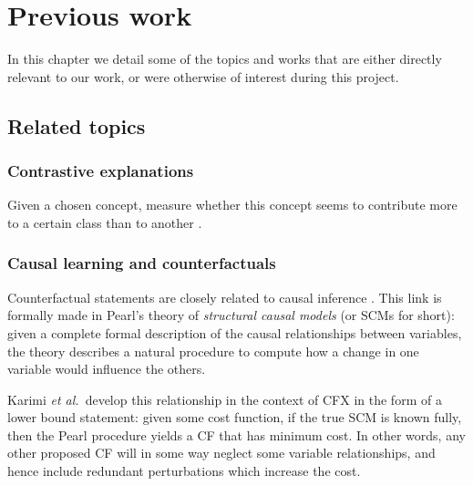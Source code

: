 \documentclass[../main.tex]{subfiles}
\begin{document}
\chapter{Previous work}
\label{ch:previous_work}

In this chapter we detail some of the topics and works that are either directly relevant to our work, or were otherwise of interest during this project.

\section{Related topics}

\subsection{Contrastive explanations}

Given a chosen concept, measure whether this concept seems to contribute more to a certain class than to another \cite{jacoviContrastive2021}.

\subsection{Causal learning and counterfactuals}

\cite{vowelsYa2023}

Counterfactual statements are closely related to causal inference \citenote.
This link is formally made in Pearl's theory of \emph{structural causal models} (or SCMs for short): given a complete formal description of the causal relationships between variables, the theory describes a natural procedure to compute how a change in one variable would influence the others. 

Karimi \textsl{et al.}~develop this relationship in the context of CFX in the form of a lower bound statement: given some cost function, if the true SCM is known fully, then the Pearl procedure yields a CF that has minimum cost.
In other words, any other proposed CF will in some way neglect some variable relationships, and hence include redundant perturbations which increase the cost.
\end{document}
